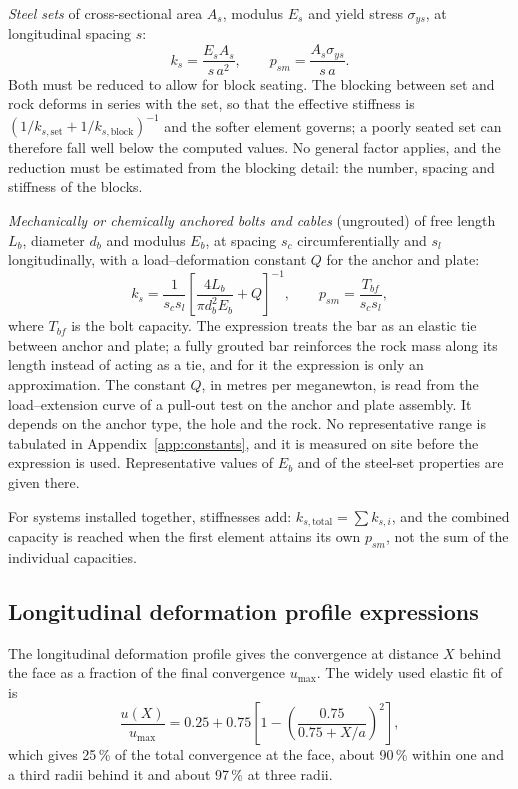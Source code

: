 \emph{Steel sets} of cross-sectional area $A_s$, modulus $E_s$ and yield
stress $\sigma_{ys}$, at longitudinal spacing $s$:
\[
k_s = \frac{E_s A_s}{s\,a^2},
\qquad
p_{sm} = \frac{A_s \sigma_{ys}}{s\,a}.
\]
Both must be reduced to allow for block seating. The blocking between set and
rock deforms in series with the set, so that the effective stiffness is
$\left(1/k_{s,\text{set}} + 1/k_{s,\text{block}}\right)^{-1}$ and the softer
element governs; a poorly seated set can therefore fall well below the
computed values. No general factor applies, and the reduction must be
estimated from the blocking detail: the number, spacing and stiffness of
the blocks.

\emph{Mechanically or chemically anchored bolts and cables} (ungrouted) of free length $L_b$, diameter $d_b$
and modulus $E_b$, at spacing $s_c$ circumferentially and $s_l$
longitudinally, with a load--deformation constant $Q$ for the anchor and
plate:
\[
k_s = \frac{1}{s_c s_l}\left[\frac{4L_b}{\pi d_b^2 E_b} + Q\right]^{-1},
\qquad
p_{sm} = \frac{T_{bf}}{s_c s_l},
\]
where $T_{bf}$ is the bolt capacity. The expression treats the bar as an elastic tie between anchor and plate; a fully grouted bar reinforces the rock mass along its length instead of acting as a tie, and for it the expression is only an approximation. The constant $Q$, in metres per
meganewton, is read from the load--extension curve of a pull-out test on the
anchor and plate assembly. It depends on the anchor type, the hole and the
rock. No representative range is tabulated in Appendix~\ref{app:constants},
and it is measured on site before the expression is used. Representative
values of $E_b$ and of the steel-set properties are given there.

For systems installed together, stiffnesses add:
$k_{s,\text{total}} = \sum k_{s,i}$, and the combined capacity is reached when the
first element attains its own $p_{sm}$, not the sum of the individual
capacities.

\subsection{Longitudinal deformation profile expressions}
\label{sec:ldp-appendix}

The longitudinal deformation profile gives the convergence at distance $X$
behind the face as a fraction of the final convergence $u_{\max}$. The widely
used elastic fit of \citet{panet1995ccm} is
\[
\frac{u(X)}{u_{\max}} = 0.25 + 0.75\left[1-\left(\frac{0.75}{0.75+X/a}\right)^{2}\right],
\]
which gives 25\,\% of the total convergence at the face, about 90\,\%
within one and a third radii behind it and about 97\,\% at three radii.

